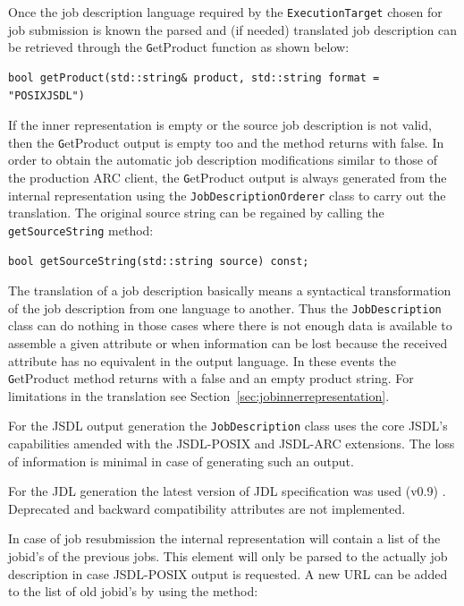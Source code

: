 \documentclass{book}
\newcommand{\ExecutionTarget}{\texttt{ExecutionTarget}}
\newcommand{\JobDescription}{\texttt{JobDescription}}
\begin{document}
Once the job description language required by the {\ExecutionTarget} chosen 
for job submission is known the parsed and (if needed) translated job description 
can be retrieved through the {\texttt GetProduct} function as shown below:

\begin{shaded}
\begin{verbatim}
bool getProduct(std::string& product, std::string format = "POSIXJSDL")
\end{verbatim}
\end{shaded}

If the inner representation is empty or the source job description is not
valid, then the {\texttt GetProduct} output is empty too and the method 
returns with false.  In order to obtain the automatic job description 
modifications similar to those of the production ARC client, the 
{\texttt GetProduct} output is always generated from the internal 
representation using the \texttt{JobDescriptionOrderer} class to carry 
out the translation. The original source string can be regained by
calling the \texttt{getSourceString} method:

\begin{shaded}
\begin{verbatim}
bool getSourceString(std::string source) const;
\end{verbatim}
\end{shaded}

The translation of a job description basically means a syntactical transformation 
of the job description from one language to another. Thus the {\JobDescription}
class can do nothing in those cases where there is not enough data is available 
to assemble a given attribute or when information can be lost because the received 
attribute has no equivalent in the output language. In these events the {\texttt GetProduct} 
method returns with a false and an empty product string. For limitations in the translation
see Section~\ref{sec:jobinnerrepresentation}.

For the JSDL output generation the {\JobDescription} class uses
the core JSDL's capabilities amended with the JSDL-POSIX and JSDL-ARC
extensions. The loss of information is minimal in case of generating
such an output.

For the JDL generation the latest version of JDL specification was
used (v0.9) \cite{jdl}. Deprecated and backward compatibility
attributes are not implemented.

In case of job resubmission the internal representation will contain a list of 
the jobid's of the previous jobs. This element will only be parsed to the 
actually job description in case JSDL-POSIX output is requested. A new URL 
can be added to the list of old jobid's by using the method:
\end{document}
